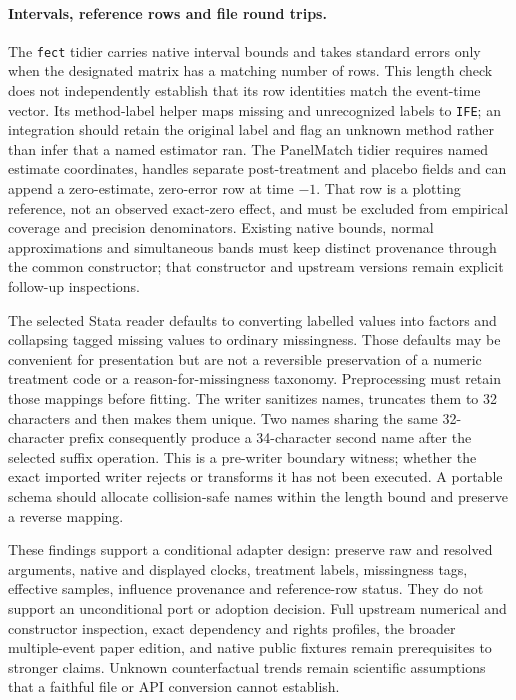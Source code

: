 \paragraph{Intervals, reference rows and file round trips.}
The \texttt{fect} tidier carries native interval bounds and takes standard
errors only when the designated matrix has a matching number of rows. This
length check does not independently establish that its row identities match
the event-time vector. Its method-label helper maps missing and unrecognized
labels to \texttt{IFE}; an integration should retain the original label and
flag an unknown method rather than infer that a named estimator ran. The
PanelMatch tidier requires named estimate coordinates, handles separate
post-treatment and placebo fields and can append a zero-estimate, zero-error
row at time $-1$. That row is a plotting reference, not an observed exact-zero
effect, and must be excluded from empirical coverage and precision denominators.
Existing native bounds, normal approximations and simultaneous bands must keep
distinct provenance through the common constructor; that constructor and
upstream versions remain explicit follow-up inspections.

The selected Stata reader defaults to converting labelled values into factors
and collapsing tagged missing values to ordinary missingness. Those defaults
may be convenient for presentation but are not a reversible preservation of a
numeric treatment code or a reason-for-missingness taxonomy. Preprocessing must
retain those mappings before fitting. The writer sanitizes names, truncates
them to 32 characters and then makes them unique. Two names sharing the same
32-character prefix consequently produce a 34-character second name after
the selected suffix operation. This is a pre-writer boundary witness; whether
the exact imported writer rejects or transforms it has not been executed.
A portable schema should allocate collision-safe names within the length bound
and preserve a reverse mapping.

These findings support a conditional adapter design: preserve raw and resolved
arguments, native and displayed clocks, treatment labels, missingness tags,
effective samples, influence provenance and reference-row status. They do not
support an unconditional port or adoption decision. Full upstream numerical
and constructor inspection, exact dependency and rights profiles, the broader
multiple-event paper edition, and native public fixtures remain prerequisites
to stronger claims. Unknown counterfactual trends remain scientific assumptions
that a faithful file or API conversion cannot establish.
